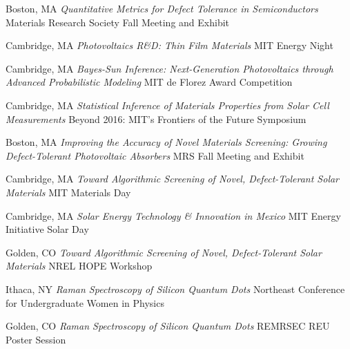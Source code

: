 \vspace{\talkyearsep}
    {Boston, MA}
    {\textit{Quantitative Metrics for Defect Tolerance in Semiconductors}}
    {Materials Research Society Fall Meeting and Exhibit}

\vspace{\talksep}
\datedsubsection{}
    {Cambridge, MA}
    {\textit{Photovoltaics R\&D: Thin Film Materials}}
    {MIT Energy Night}

\vspace{\talksep}
\datedsubsection{}
    {Cambridge, MA}
    {\textit{Bayes-Sun Inference: Next-Generation Photovoltaics through Advanced Probabilistic Modeling}}
    {MIT de Florez Award Competition}

\vspace{\talksep}
\datedsubsection{}
    {Cambridge, MA}
    {\textit{Statistical Inference of Materials Properties from Solar Cell Measurements}}
    {Beyond 2016: MIT’s Frontiers of the Future Symposium}

\vspace{\talkyearsep}
    {Boston, MA}
    {\textit{Improving the Accuracy of Novel Materials Screening: Growing Defect-Tolerant Photovoltaic Absorbers}}
    {MRS Fall Meeting and Exhibit}

\vspace{\talksep}
\datedsubsection{}
    {Cambridge, MA}
    {\textit{Toward Algorithmic Screening of Novel, Defect-Tolerant Solar Materials}}
    {MIT Materials Day}

\vspace{\talksep}
\datedsubsection{}
    {Cambridge, MA}
    {\textit{Solar Energy Technology \& Innovation in Mexico}}
    {MIT Energy Initiative Solar Day}

\vspace{\talksep}
\datedsubsection{}
    {Golden, CO}
    {\textit{Toward Algorithmic Screening of Novel, Defect-Tolerant Solar Materials}}
    {NREL HOPE Workshop}

\vspace{\talkyearsep}
    {Ithaca, NY}
    {\textit{Raman Spectroscopy of Silicon Quantum Dots}}
    {Northeast Conference for Undergraduate Women in Physics}

\vspace{\talksep}
    {Golden, CO}
    {\textit{Raman Spectroscopy of Silicon Quantum Dots}}
    {REMRSEC REU Poster Session}
